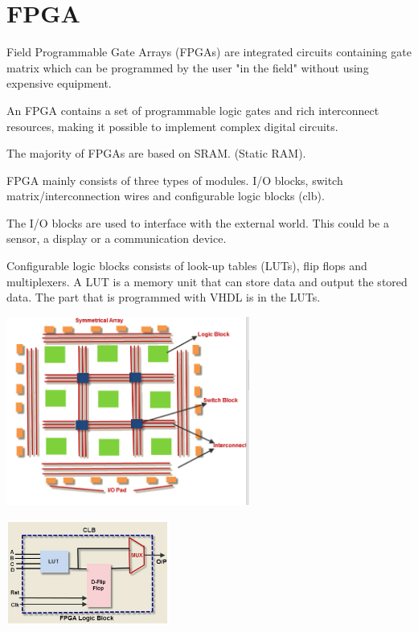 \section{FPGA}

Field Programmable Gate Arrays (FPGAs) are integrated circuits
containing gate matrix which can be programmed by the user
"in the field" without using expensive equipment.

An FPGA contains a set of programmable logic gates and rich interconnect
resources, making it possible to implement complex digital circuits.

The majority of FPGAs are based on SRAM. (Static RAM).

FPGA mainly consists of three types of modules.
I/O blocks, switch matrix/interconnection wires and configurable
logic blocks (clb).

The I/O blocks are used to interface with the external world.
This could be a sensor, a display or a communication device.

Configurable logic blocks consists of look-up tables (LUTs),
flip flops and multiplexers.
A LUT is a memory unit that can store data and output the stored data.
The part that is programmed with VHDL is in the LUTs.


\begin{center}
	\includegraphics[width=0.6\textwidth]{images/fpga.png}
\end{center}


\begin{center}
	\includegraphics[width=0.4\textwidth]{images/clb.png}
\end{center}



